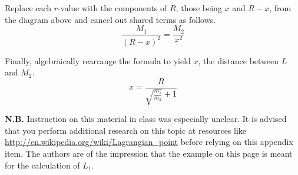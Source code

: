 Replace each $r$-value with the components of $R$, those being $x$ and $R-x$, from the diagram above and cancel out shared terms as follows.
\begin{equation*}
  \displaystyle\frac{M_1}{\left(R-x\right)^2} = \frac{M_2}{x^2}
\end{equation*}

Finally, algebraically rearrange the formula to yield $x$, the distance between $L$ and $M_2$.
\begin{equation*}
  x = \frac{R}{\sqrt{\frac{m_1}{m_2}} + 1} 
\end{equation*}

\textbf{N.B.} Instruction on this material in class was especially unclear. It is advised that you perform additional research on this topic at resources like \url{http://en.wikipedia.org/wiki/Lagrangian_point} before relying on this appendix item. The authors are of the impression that the example on this page is meant for the calculation of $L_1$.


